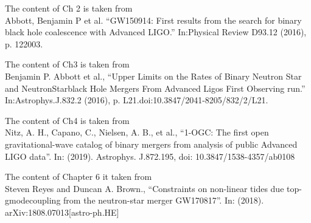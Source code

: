 \documentclass[12pt,notitlepage]{report}
\begin{document}
The content of Ch 2 is taken from  \\
Abbott, Benjamin P et al. ``GW150914: First results from the search for binary black hole coalescence with Advanced LIGO.'' In:Physical Review D93.12 (2016), p. 122003.

The content of Ch3 is taken from \\
Benjamin P. Abbott et al., ``Upper Limits on the Rates of Binary Neutron Star and NeutronStarblack Hole Mergers From Advanced Ligos First Observing run.'' In:Astrophys.J.832.2  (2016),  p.  L21.doi:10.3847/2041-8205/832/2/L21.

The content of Ch4 is taken from \\
Nitz, A. H., Capano, C., Nielsen, A. B., et al., ``1-OGC: The first open gravitational-wave catalog of binary mergers from analysis of public Advanced LIGO data''. In: (2019).
Astrophys. J.872.195, doi: 10.3847/1538-4357/ab0108

The content of Chapter 6 it taken from \\
Steven Reyes and Duncan A. Brown., ``Constraints on non-linear tides due top-gmodecoupling  from  the  neutron-star  merger  GW170817''.  In:  (2018).  arXiv:1808.07013[astro-ph.HE] 

\afterpreface


\label{ch:Introduction}


\label{ch:GW150914_PyCBC_Offline}


\label{ch:BNS_NSBH_Upper_Limits}


\label{ch:1_OGC}


\label{ch:Bayesian_data_analysis}


\label{ch:pg_modes}


\label{ch:conclusions}


%
\end{document}
